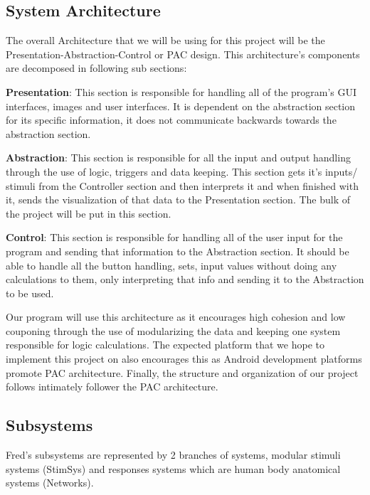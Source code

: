 \documentclass[]{article}
\begin{document}
\subsection{System Architecture}
\label{sub:system_architecture}

	The overall Architecture that we will be using for this project will be the Presentation-Abstraction-Control or PAC design. This architecture’s components are decomposed in following sub sections:

\textbf{Presentation}: This section is responsible for handling all of the program’s GUI interfaces, images and user interfaces. It is dependent on the abstraction section for its specific information, it does not communicate backwards towards the abstraction section.

\textbf{Abstraction}: This section is responsible for all the input and output handling through the use of logic, triggers and data keeping. This section gets it’s inputs/ stimuli from the Controller section and then interprets it and when finished with it, sends the visualization of that data to the Presentation section. The bulk of the project will be put in this section.

\textbf{Control}: This section is responsible for handling all of the user input for the program and sending that information to the Abstraction section. It should be able to handle all the button handling, sets, input values without doing any calculations to them, only interpreting that info and sending it to the Abstraction to be used.

	Our program will use this architecture as it encourages high cohesion and low couponing through the use of modularizing the data and keeping one system responsible for logic calculations. The expected platform that we hope to implement this project on also encourages this as Android development platforms promote PAC architecture. Finally, the structure and organization of our project follows intimately follower the PAC architecture.


\subsection{Subsystems}
\label{sub:subsystems}

Fred's subsystems are represented by 2 branches of systems, modular stimuli systems (StimSys) and responses systems which are human body anatomical systems (Networks).
\end{document}
